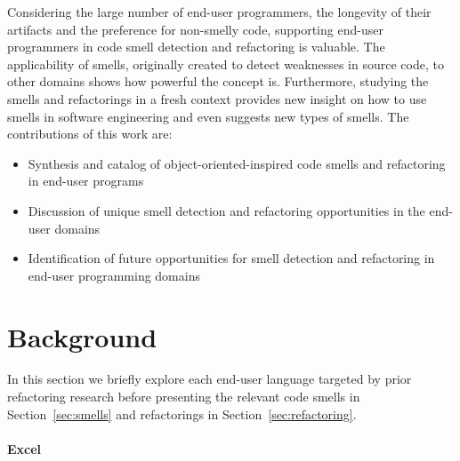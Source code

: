 \documentclass[10pt,conference,compsocconf]{IEEEtran}
\begin{document}
Considering the large number of end-user programmers, the longevity of their artifacts and the preference for non-smelly code, supporting end-user programmers in code smell detection and refactoring is valuable.
The applicability of smells, originally created to detect weaknesses in source code, to other domains shows how powerful the concept is.
Furthermore, studying the smells and refactorings in a fresh context provides new insight on how to use smells in software engineering and  even suggests new types of smells.
The contributions of this work are:

\begin{itemize}
	\item Synthesis and catalog of object-oriented-inspired code smells  and refactoring in end-user programs
	\item Discussion of unique smell detection and refactoring opportunities in the end-user domains %
	\item Identification of future opportunities for smell detection and refactoring in end-user programming domains
\end{itemize}


\section{Background}
\label{sec:background}

In this section we briefly explore each end-user language targeted by prior refactoring research  before presenting the relevant code smells in  Section~\ref{sec:smells} and refactorings in Section~\ref{sec:refactoring}.

\paragraph{Excel}
\end{document}
